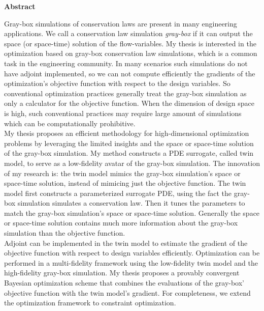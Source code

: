 \documentclass[a4paper,onecolumn]{article}
\theoremstyle{remark}
\begin{document}
\setcounter{page}{1}

$$ $$
\newpage
\hspace{.4\textwidth}
\Large\textbf{Abstract}\\
\normalsize

\noindent Gray-box simulations of conservation laws are
present in many engineering applications. 
We call a conservation law simulation \emph{gray-box} if it can output the space 
(or space-time) solution of the flow-variables.
My thesis is interested in the optimization based on gray-box conservation law simulations,
which is a common task in the engineering community.
In many scenarios such simulations do not have adjoint implemented,
so we can not compute efficiently the gradients of 
the optimization's objective function with respect to the design variables. 
So conventional optimization practices generally treat the gray-box simulation
as only a calculator for the objective function. 
When the dimension of design space is high,
such conventional practices may require large amount of simulations which can be 
computationally prohibitive.\\

\noindent My thesis proposes an efficient methodology for
high-dimensional optimization problems by leveraging the limited insights
and the space or space-time solution of the gray-box simulation. 
My method constructs a PDE surrogate, 
called twin model, to serve as a low-fidelity avatar of the gray-box simulation. 
The innovation of my research is: the twin model mimics the gray-box simulation's space 
or space-time solution, instead of mimicing just the objective function.
The twin model first constructs a parameterized surrogate PDE, using the 
fact the gray-box simulation simulates a conservation law. Then it tunes the parameters to match the 
gray-box simulation's space or space-time solution.
Generally the space or space-time solution contains much more information 
about the gray-box simulation than the objective function.\\

\noindent Adjoint can be implemented in the twin model to 
estimate the gradient of the objective function with respect to design variables efficiently.
Optimization can be performed in a multi-fidelity framework using the low-fidelity
twin model and the high-fidelity gray-box simulation.
My thesis proposes a provably convergent Bayesian optimization scheme that combines
the evaluations of the gray-box' objective function with the twin model's gradient.
For completeness, we extend the optimization framework to constraint optimization.
\\
\end{document}
